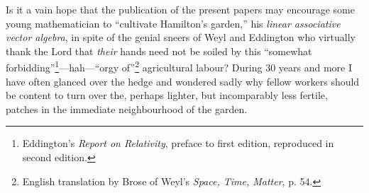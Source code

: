 \documentclass[11pt]{article}
\begin{document}
{\renewcommand\thefootnote{\fnsymbol{footnote}}\setcounter{footnote}{0}
\indent Is it a vain hope that the publication of the present papers may encourage some young mathematician to ``cultivate Hamilton's garden,'' his \emph{linear associative vector algebra}, in spite of the genial sneers of Weyl and Eddington who virtually thank the Lord that \emph{their} hands need not be soiled by this ``somewhat forbidding''\footnote{Eddington's \emph{Report on Relativity}, preface to first edition, reproduced in second edition.}---hah---``orgy of''\footnote{English translation by Brose of Weyl's \emph{Space, Time, Matter}, p. 54.} agricultural labour? During 30 years and more I have often glanced over the hedge and wondered sadly why fellow workers should be content to turn over the, perhaps lighter, but incomparably less fertile, patches in the immediate neighbourhood of the garden.}
\end{document}
